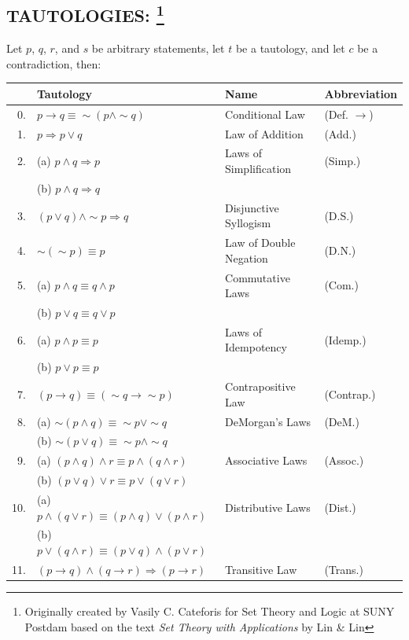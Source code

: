 \setlength{\extrarowheight}{5pt}

\subsection*{TAUTOLOGIES: \footnote{Originally created by Vasily C. Cateforis for Set Theory and Logic at SUNY Postdam based on the text {\em Set Theory with Applications} by Lin \& Lin}
}

\noindent
Let $p$, $q$, $r$, and $s$ be arbitrary statements, let $t$ be a tautology, and let $c$ be a contradiction, then:\vspace{10pt}

\noindent
\begin{tabular}{rlll}%
&Tautology & Name & Abbreviation\\ \hline
0. & $p\rightarrow q \equiv \sim(p\land \sim q)$ & Conditional Law & (Def. $\rightarrow$)\\
1. & $p\Rightarrow p\lor q$ & Law of Addition & (Add.)\\
2. & (a) $p\land q\Rightarrow p$ & Laws of Simplification & (Simp.)\\
    & (b) $p\land q\Rightarrow q$ &&\\
3. & $(p\lor q)\land \sim p \Rightarrow q$ & Disjunctive Syllogism & (D.S.)\\
4. & $\sim (\sim p)\equiv p$ & Law of Double Negation & (D.N.)\\
5. & (a) $p\land q \equiv q\land p$ & Commutative Laws & (Com.)\\
	&(b) $p\lor q \equiv q\lor p$ & &\\
6.	&(a) $p\land p \equiv p$ & Laws of Idempotency & (Idemp.)\\
	&(b) $p\lor p \equiv p$&&\\
7. & $(p\rightarrow q)\equiv (\sim q\rightarrow\sim p)$ & Contrapositive Law & (Contrap.)\\
8.	&(a) $\sim (p\land q)\equiv \sim p \lor \sim q$ & DeMorgan's Laws & (DeM.)\\
	&(b) $\sim (p\lor q)\equiv \sim p \land \sim q$ &&\\
9.	&(a) $(p\land q)\land r\equiv p\land (q\land r)$ &	Associative Laws & (Assoc.)\\
	&(b) $(p\lor q)\lor r\equiv p\lor (q\lor r)$ &&\\
10.	&(a) $p\land(q\lor r)\equiv (p\land q)\lor(p\land r)$ & Distributive Laws & (Dist.)\\
	&(b) $p\lor(q\land r)\equiv (p\lor q)\land(p\lor r)$ &&\\
11. &$(p\rightarrow q)\land (q\rightarrow r)\Rightarrow (p\rightarrow r)$ & Transitive Law & (Trans.) %
\end{tabular}

